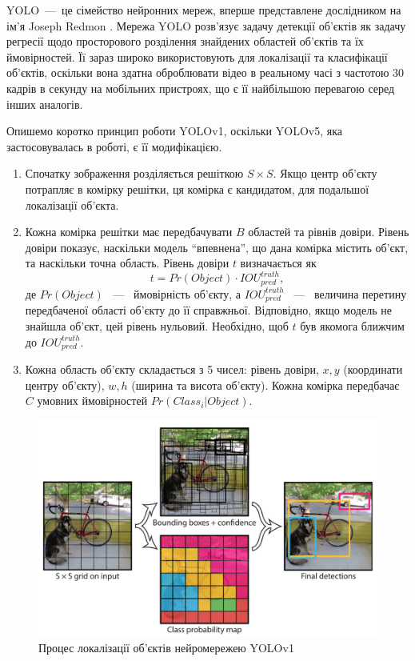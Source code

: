 YOLO~---~це сімейство нейронних мереж, вперше представлене дослідником на ім'я Joseph Redmon \cite{yolov1}.
Мережа YOLO розв'язує задачу детекції об'єктів як задачу регресії
щодо просторового розділення знайдених областей об'єктів та їх
ймовірностей. Її зараз широко використовують для локалізації та класифікації об'єктів,
оскільки вона здатна оброблювати відео в реальному часі з частотою 30 кадрів в секунду
на мобільних пристроях, що є її найбільшою перевагою серед інших аналогів.

Опишемо коротко принцип роботи YOLOv1, оскільки YOLOv5, яка застосовувалась
в роботі, є її модифікацією.
\begin{enumerate}
    \item Спочатку зображення розділяється решіткою $S \times S$.
          Якщо центр об'єкту потрапляє в комірку решітки, ця комірка
          є кандидатом, для подальшої локалізації об'єкта.
    \item Кожна комірка решітки має передбачувати $B$ областей та рівнів
          довіри. Рівень довіри показує, наскільки модель ``впевнена'',
          що дана комірка містить об'єкт, та наскільки точна область.
          Рівень довіри $t$ визначається  як
          \begin{equation*}
              t = Pr(Object) \cdot {IOU}_{pred}^{truth},
          \end{equation*}
          де $Pr(Object)$ ~---~ ймовірність об'єкту, а ${IOU}_{pred}^{truth}$ ~---~ величина
          перетину передбаченої області об'єкту до її справжньої.
          Відповідно, якщо модель не знайшла об'єкт, цей рівень нульовий.
          Необхідно, щоб $t$ був якомога ближчим до ${IOU}_{pred}^{truth}$.
    \item Кожна область об'єкту складається з 5 чисел: рівень довіри,
          $x, y$ (координати центру об'єкту),  $w, h$ (ширина та висота об'єкту).
          Кожна комірка передбачає $C$ умовних ймовірностей $Pr(Class_i|Object)$.
\end{enumerate}

\begin{figure}[H]
    \includegraphics[width=0.5\linewidth]{images/cnn_yolo1}
    \centering
    \caption{Процес локалізації об'єктів нейромережею YOLOv1 \cite{yolov1}
    }
\end{figure}

